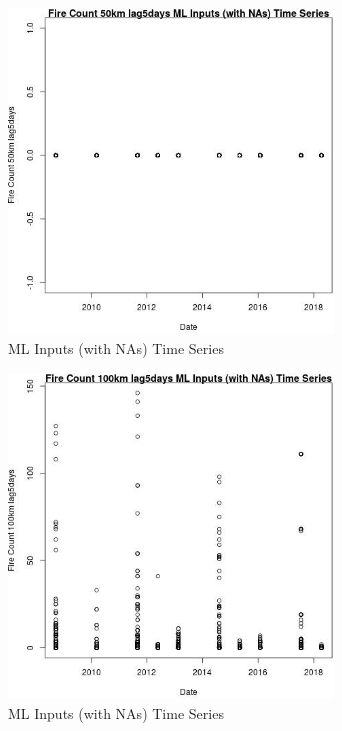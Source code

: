 \begin{figure} 
\centering  
\includegraphics[width=0.77\textwidth]{Code_Outputs/Report_ML_input_PM25_Step4_part_e_de_duplicated_aves_compiled_2019-05-18wNAs_Fire_Count_50km_lag5daysvDate.jpg} 
\caption{\label{fig:Report_ML_input_PM25_Step4_part_e_de_duplicated_aves_compiled_2019-05-18wNAsFire_Count_50km_lag5daysvDate}ML Inputs (with NAs) Time Series} 
\end{figure} 
 

\clearpage 

\begin{figure} 
\centering  
\includegraphics[width=0.77\textwidth]{Code_Outputs/Report_ML_input_PM25_Step4_part_e_de_duplicated_aves_compiled_2019-05-18wNAs_Fire_Count_100km_lag5daysvDate.jpg} 
\caption{\label{fig:Report_ML_input_PM25_Step4_part_e_de_duplicated_aves_compiled_2019-05-18wNAsFire_Count_100km_lag5daysvDate}ML Inputs (with NAs) Time Series} 
\end{figure} 
 

